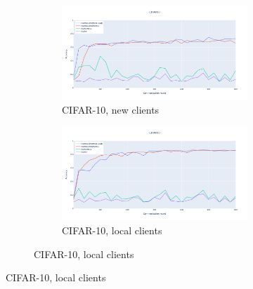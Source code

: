 \begin{figure}
    \centering
    \begin{subfigure}{\textwidth}
        \centering
        \begin{subfigure}{.5\textwidth}
            \centering
            \includegraphics[width=\linewidth]{./images/cifar_per_new.png}
            \caption{CIFAR-10, new clients}
            \label{fig:cifar_per_new}
        \end{subfigure}%
        \begin{subfigure}{.5\textwidth}
            \centering
            \includegraphics[width=\linewidth]{./images/cifar_per_old.png}
            \caption{CIFAR-10, local clients}
            \label{fig:cifar_per_old}
        \end{subfigure}
    \end{subfigure}


\end{figure}
